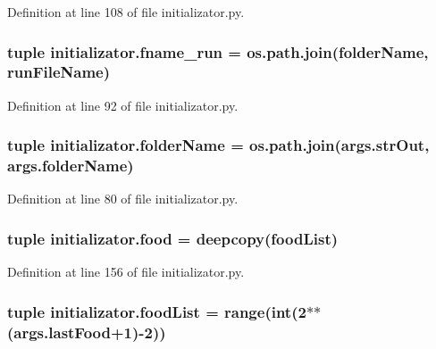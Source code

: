 Definition at line 108 of file initializator.\-py.

\hypertarget{a00104_a6bc5100ec1c6492cec974172df243857}{
\subsubsection[{fname\-\_\-run}]{\setlength{\rightskip}{0pt plus 5cm}tuple initializator.\-fname\-\_\-run = os.\-path.\-join({\bf folder\-Name}, {\bf run\-File\-Name})}}\label{a00104_a6bc5100ec1c6492cec974172df243857}


Definition at line 92 of file initializator.\-py.

\hypertarget{a00104_aa51c106700ef9afbdb94a1c800e10569}{
\subsubsection[{folder\-Name}]{\setlength{\rightskip}{0pt plus 5cm}tuple initializator.\-folder\-Name = os.\-path.\-join(args.\-str\-Out, args.\-folder\-Name)}}\label{a00104_aa51c106700ef9afbdb94a1c800e10569}


Definition at line 80 of file initializator.\-py.

\hypertarget{a00104_a4fe31b6cfa3dcaa4141be9282566fa7a}{
\subsubsection[{food}]{\setlength{\rightskip}{0pt plus 5cm}tuple initializator.\-food = deepcopy({\bf food\-List})}}\label{a00104_a4fe31b6cfa3dcaa4141be9282566fa7a}


Definition at line 156 of file initializator.\-py.

\hypertarget{a00104_a402edf66e27aa29932e16311c9756b02}{
\subsubsection[{food\-List}]{\setlength{\rightskip}{0pt plus 5cm}tuple initializator.\-food\-List = range(int(2$\ast$$\ast$(args.\-last\-Food+1)-\/2))}}\label{a00104_a402edf66e27aa29932e16311c9756b02}


